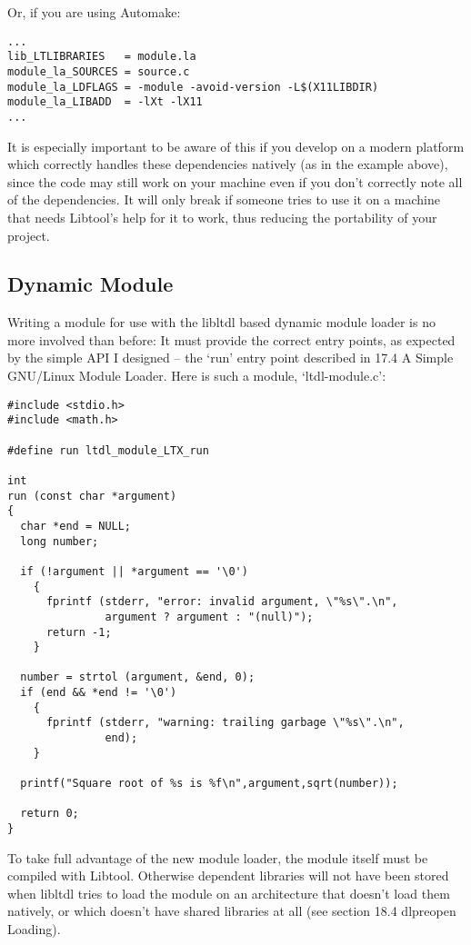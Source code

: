 Or, if you are using Automake:

\begin{Verbatim}[frame=single]
...
lib_LTLIBRARIES   = module.la
module_la_SOURCES = source.c
module_la_LDFLAGS = -module -avoid-version -L$(X11LIBDIR)
module_la_LIBADD  = -lXt -lX11
...
\end{Verbatim}

It is especially important to be aware of this if you develop on a modern platform which correctly handles these dependencies natively (as in the example above), since the code may still work on your machine even if you don't correctly note all of the dependencies. It will only break if someone tries to use it on a machine that needs Libtool's help for it to work, thus reducing the portability of your project.

\subsection{Dynamic Module}

Writing a module for use with the libltdl based dynamic module loader is no more involved than before: It must provide the correct entry points, as expected by the simple API I designed -- the `run' entry point described in 17.4 A Simple GNU/Linux Module Loader. Here is such a module, `ltdl-module.c': 

\begin{Verbatim}[frame=single]
#include <stdio.h>
#include <math.h>

#define run ltdl_module_LTX_run

int
run (const char *argument)
{
  char *end = NULL;
  long number;
  
  if (!argument || *argument == '\0')
    {
      fprintf (stderr, "error: invalid argument, \"%s\".\n",
               argument ? argument : "(null)");
      return -1;
    }
  
  number = strtol (argument, &end, 0);
  if (end && *end != '\0')
    {
      fprintf (stderr, "warning: trailing garbage \"%s\".\n",
               end);
    }

  printf("Square root of %s is %f\n",argument,sqrt(number));

  return 0;
}
\end{Verbatim}

To take full advantage of the new module loader, the module itself must be compiled with Libtool. Otherwise dependent libraries will not have been stored when libltdl tries to load the module on an architecture that doesn't load them natively, or which doesn't have shared libraries at all (see section 18.4 dlpreopen Loading).


